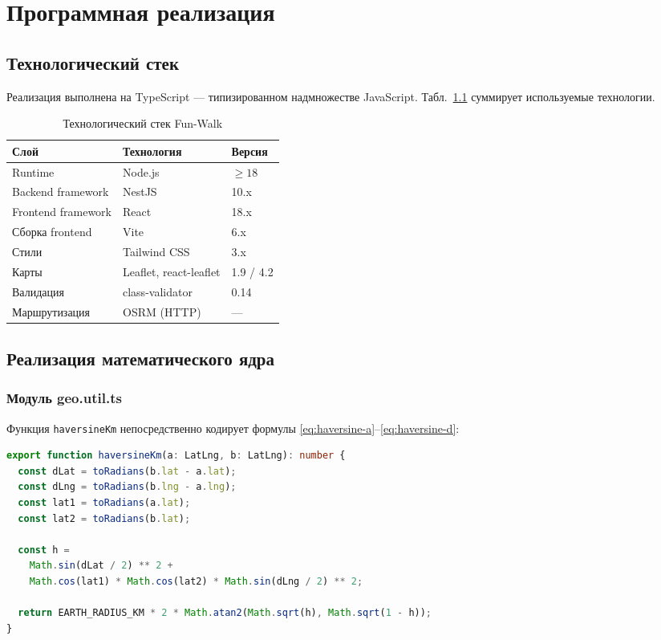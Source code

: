 \chapter{Программная реализация}
\label{ch:implementation}

\section{Технологический стек}

Реализация выполнена на TypeScript --- типизированном надмножестве JavaScript.
Табл.~\ref{tab:stack} суммирует используемые технологии.

\begin{table}[H]
\centering
\caption{Технологический стек Fun-Walk}
\label{tab:stack}
\begin{tabular}{@{}lll@{}}
\toprule
\textbf{Слой} & \textbf{Технология} & \textbf{Версия} \\
\midrule
Runtime & Node.js & $\geq 18$ \\
Backend framework & NestJS & 10.x \\
Frontend framework & React & 18.x \\
Сборка frontend & Vite & 6.x \\
Стили & Tailwind CSS & 3.x \\
Карты & Leaflet, react-leaflet & 1.9 / 4.2 \\
Валидация & class-validator & 0.14 \\
Маршрутизация & OSRM (HTTP) & --- \\
\bottomrule
\end{tabular}
\end{table}

\section{Реализация математического ядра}

\subsection{Модуль geo.util.ts}

Функция \texttt{haversineKm} непосредственно кодирует формулы
\eqref{eq:haversine-a}--\eqref{eq:haversine-d}:

\begin{lstlisting}[language=TypeScript,caption={Реализация формулы Haversine},label={lst:haversine}]
export function haversineKm(a: LatLng, b: LatLng): number {
  const dLat = toRadians(b.lat - a.lat);
  const dLng = toRadians(b.lng - a.lng);
  const lat1 = toRadians(a.lat);
  const lat2 = toRadians(b.lat);

  const h =
    Math.sin(dLat / 2) ** 2 +
    Math.cos(lat1) * Math.cos(lat2) * Math.sin(dLng / 2) ** 2;

  return EARTH_RADIUS_KM * 2 * Math.atan2(Math.sqrt(h), Math.sqrt(1 - h));
}
\end{lstlisting}

